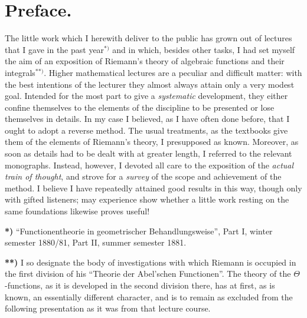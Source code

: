 \documentclass{article}
\begin{document}

\section*{Preface.}

The little work which I herewith deliver to the public has grown out of lectures that I gave in the past year${}^{*)}$ and in which, besides other tasks, I had set myself the aim of an exposition of Riemann's theory of algebraic functions and their integrals${}^{**)}$. Higher mathematical lectures are a peculiar and difficult matter: with the best intentions of the lecturer they almost always attain only a very modest goal. Intended for the most part to give a \emph{systematic} development, they either confine themselves to the elements of the discipline to be presented or lose themselves in details. In my case I believed, as I have often done before, that I ought to adopt a reverse method. The usual treatments, as the textbooks give them of the elements of Riemann's theory, I presupposed as known. Moreover, as soon as details had to be dealt with at greater length, I referred to the relevant monographs. Instead, however, I devoted all care to the exposition of the \emph{actual train of thought}, and strove for a \emph{survey} of the scope and achievement of the method. I believe I have repeatedly attained good results in this way, though only with gifted listeners; may experience show whether a little work resting on the same foundations likewise proves useful!

\textbf{*)} “Functionentheorie in geometrischer Behandlungsweise”, Part I, winter semester 1880/81, Part II, summer semester 1881.

\textbf{**)} I so designate the body of investigations with which Riemann is occupied in the first division of his “Theorie der Abel'schen Functionen”. The theory of the $\Theta$-functions, as it is developed in the second division there, has at first, as is known, an essentially different character, and is to remain as excluded from the following presentation as it was from that lecture course.

\end{document}
